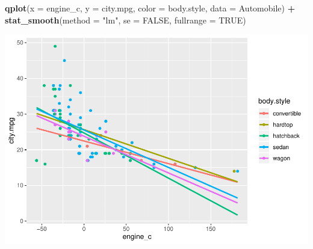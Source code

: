 \documentclass[]{article}
\newenvironment{Shaded}{\begin{snugshade}}{\end{snugshade}}
\newcommand{\KeywordTok}[1]{\textcolor[rgb]{0.13,0.29,0.53}{\textbf{#1}}}
\newcommand{\DataTypeTok}[1]{\textcolor[rgb]{0.13,0.29,0.53}{#1}}
\newcommand{\DecValTok}[1]{\textcolor[rgb]{0.00,0.00,0.81}{#1}}
\newcommand{\StringTok}[1]{\textcolor[rgb]{0.31,0.60,0.02}{#1}}
\newcommand{\CommentTok}[1]{\textcolor[rgb]{0.56,0.35,0.01}{\textit{#1}}}
\newcommand{\OtherTok}[1]{\textcolor[rgb]{0.56,0.35,0.01}{#1}}
\newcommand{\OperatorTok}[1]{\textcolor[rgb]{0.81,0.36,0.00}{\textbf{#1}}}
\newcommand{\NormalTok}[1]{#1}
\begin{document}
\begin{Shaded}
\begin{Highlighting}[]
\KeywordTok{qplot}\NormalTok{(}\DataTypeTok{x =}\NormalTok{ engine_c, }\DataTypeTok{y =}\NormalTok{ city.mpg, }\DataTypeTok{color =}\NormalTok{ body.style, }\DataTypeTok{data =}\NormalTok{ Automobile) }\OperatorTok{+}\StringTok{ }
\StringTok{    }\KeywordTok{stat_smooth}\NormalTok{(}\DataTypeTok{method =} \StringTok{"lm"}\NormalTok{, }\DataTypeTok{se =} \OtherTok{FALSE}\NormalTok{, }\DataTypeTok{fullrange =} \OtherTok{TRUE}\NormalTok{)}
\end{Highlighting}
\end{Shaded}

\begin{center}\includegraphics{project2_files/figure-latex/unnamed-chunk-3-2} \end{center}

\begin{Shaded}
\end{Shaded}
\end{document}
